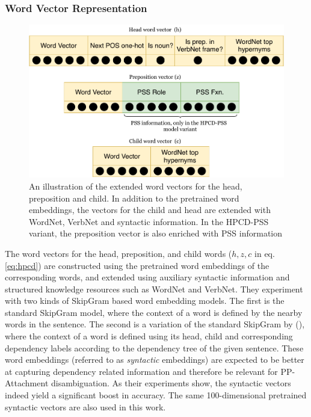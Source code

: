 \subsubsection{Word Vector Representation} \label{section:hpcd_wordvectors}

\begin{figure}
    \centering
    \includegraphics[width=\textwidth]{Figures/hpcd_vec.pdf}
    \caption{An illustration of the extended word vectors for the head, preposition and child. In addition to the pretrained word embeddings, the vectors for the child and head are extended with WordNet, VerbNet and syntactic information. In the HPCD-PSS variant, the preposition vector is also enriched with PSS information}
    \label{fig:hpcdvectors}
\end{figure}

The word vectors for the head, preposition, and child words ($h, z, c$ in eq. \ref{eq:hpcd}) are constructed using the pretrained word embeddings of the corresponding words, and extended using auxiliary syntactic information and structured knowledge resources such as WordNet and VerbNet. They experiment with two kinds of SkipGram based word embedding models. The first is the standard SkipGram model, where the context of a word is defined by the nearby words in the sentence. The second is a variation of the standard SkipGram by (\cite{bansal}), where the context of a word is defined using its head, child and corresponding dependency labels according to the dependency tree of the given sentence. These word embeddings (referred to as \textit{syntactic} embeddings) are expected to be better at capturing dependency related information and therefore be relevant for PP-Attachment disambiguation. As their experiments show, the syntactic vectors indeed yield a significant boost in accuracy. The same 100-dimensional pretrained syntactic vectors are also used in this work. 

